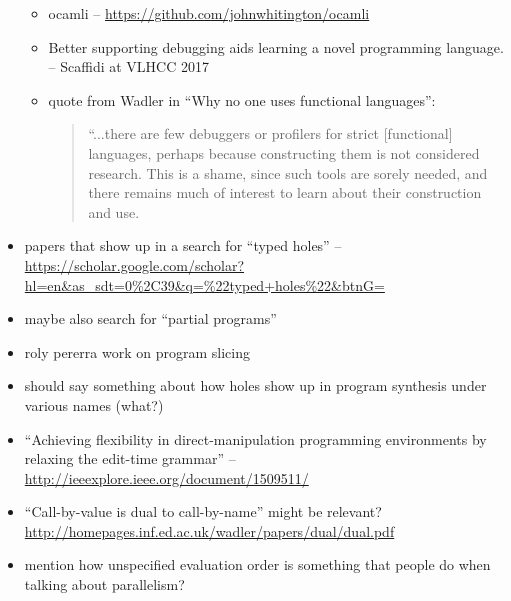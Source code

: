 \begin{itemize}
\begin{itemize}
		\item ocamli -- \url{https://github.com/johnwhitington/ocamli}
		\item Better supporting debugging aids learning a novel programming language. -- Scaffidi at VLHCC 2017
		\item quote from Wadler in ``Why no one uses functional languages'':
			\begin{quote}
			“...there are few debuggers or
profilers for strict [functional] languages, perhaps because constructing them is not considered
research. This is a shame, since such tools are sorely needed, and there remains much of
interest to learn about their construction and use.
\end{quote}
		\end{itemize}
	\item papers that show up in a search for ``typed holes'' -- \url{https://scholar.google.com/scholar?hl=en&as_sdt=0%2C39&q=%22typed+holes%22&btnG=}
	\item maybe also search for ``partial programs'' 
	\item roly pererra work on program slicing
	\item should say something about how holes show up in program synthesis under various names (what?) 
	\item ``Achieving flexibility in direct-manipulation programming environments by relaxing the edit-time grammar'' -- \url{http://ieeexplore.ieee.org/document/1509511/}
	\item ``Call-by-value is dual to call-by-name'' might be relevant? \url{http://homepages.inf.ed.ac.uk/wadler/papers/dual/dual.pdf}
	\item mention how unspecified evaluation order is something that people do when talking about parallelism?
\end{itemize}
